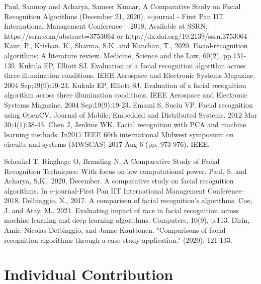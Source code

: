 \documentclass[openany]{report}
\begin{document}
\begin{thebibliography}{10}
    Paul, Sanmoy and Acharya, Sameer Kumar, A Comparative Study on Facial Recognition Algorithms (December 21, 2020). e-journal - First Pan IIT International Management Conference – 2018, Available at SSRN: https://ssrn.com/abstract=3753064 or http://dx.doi.org/10.2139/ssrn.3753064
    Kaur, P., Krishan, K., Sharma, S.K. and Kanchan, T., 2020. Facial-recognition algorithms: A literature review. Medicine, Science and the Law, 60(2), pp.131-139.
    Kukula EP, Elliott SJ. Evaluation of a facial recognition algorithm across three illumination conditions. IEEE Aerospace and Electronic Systems Magazine. 2004 Sep;19(9):19-23.
    Kukula EP, Elliott SJ. Evaluation of a facial recognition algorithm across three illumination conditions. IEEE Aerospace and Electronic Systems Magazine. 2004 Sep;19(9):19-23.
    Emami S, Suciu VP. Facial recognition using OpenCV. Journal of Mobile, Embedded and Distributed Systems. 2012 Mar 30;4(1):38-43.
    Chen J, Jenkins WK. Facial recognition with PCA and machine learning methods. In2017 IEEE 60th international Midwest symposium on circuits and systems (MWSCAS) 2017 Aug 6 (pp. 973-976). IEEE.

    Schenkel T, Ringhage O, Branding N. A Comparative Study of Facial Recognition Techniques: With focus on low computational power.
    Paul, S. and Acharya, S.K., 2020, December. A comparative study on facial recognition algorithms. In e-journal-First Pan IIT International Management Conference–2018.
    Delbiaggio, N., 2017. A comparison of facial recognition’s algorithms.
    Coe, J. and Atay, M., 2021. Evaluating impact of race in facial recognition across machine learning and deep learning algorithms. Computers, 10(9), p.113.
    Dirin, Amir, Nicolas Delbiaggio, and Janne Kauttonen. "Comparisons of facial recognition algorithms through a case study application." (2020): 121-133.

\end{thebibliography}


\chapter{Individual Contribution}
\end{document}
